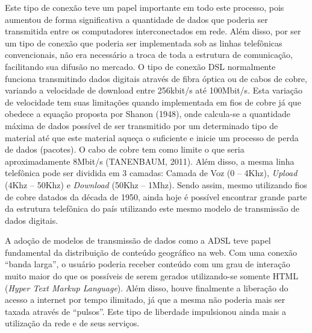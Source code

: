 Este tipo de conexão teve um papel importante em todo este processo, pois aumentou de forma significativa a quantidade de dados que poderia ser transmitida entre os computadores interconectados em rede. Além disso, por ser um tipo de conexão que poderia ser implementada sob as linhas telefônicas convencionais, não era necessário a troca de toda a estrutura de comunicação, facilitando sua difusão no mercado. O tipo de conexão DSL normalmente funciona transmitindo dados digitais através de fibra óptica ou de cabos de cobre, variando a velocidade de download entre 256kbit/s até 100Mbit/s. Esta variação de velocidade tem suas limitações quando implementada em fios de cobre já que obedece a equação proposta por Shanon (1948)\cite{SHANNON}, onde calcula-se a quantidade máxima de dados possível de ser transmitido por um determinado tipo de material até que este material aqueça o suficiente e inicie um processo de perda de dados (pacotes). O cabo de cobre tem como limite o que seria aproximadamente 8Mbit/s (TANENBAUM, 2011)\cite{TANENBAUM_11}. Além disso, a mesma linha telefônica pode ser dividida em 3 camadas: Camada de Voz (0 – 4Khz), \textit{Upload} (4Khz – 50Khz) e \textit{Download} (50Khz – 1Mhz). Sendo assim, mesmo utilizando fios de cobre datados da década de 1950, ainda hoje é possível encontrar grande parte da estrutura telefônica do país utilizando este mesmo modelo de transmissão de dados digitais. 

A adoção de modelos de transmissão de dados como a ADSL teve papel fundamental da distribuição de conteúdo geográfico na web. Com uma conexão “banda larga”, o usuário poderia receber conteúdo com um grau de interação muito maior do que os possíveis de serem gerados utilizando-se somente HTML (\textit{Hyper Text Markup Language}). Além disso, houve finalmente a liberação do acesso a internet por tempo ilimitado, já que a mesma não poderia mais ser taxada através de “pulsos”. Este tipo de liberdade impulsionou ainda mais a utilização da rede e de seus serviços. 

